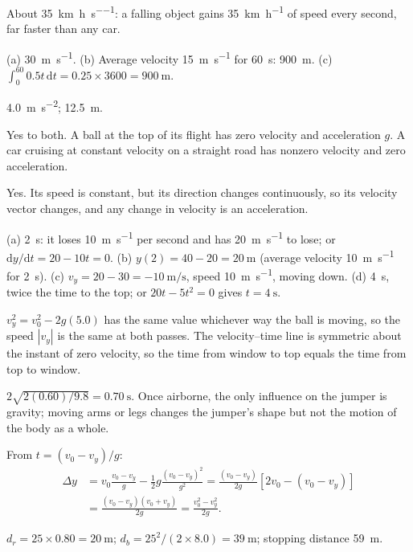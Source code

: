 \documentclass[11pt,twoside,openany]{book}
\newcommand{\dd}{\mathrm{d}}
\begin{document}
\begin{description}[leftmargin=2.6em,itemsep=3pt,style=sameline]
  \item[2.43] About \SI{35}{\kilo\metre\per\hour\per\second}: a falling object gains \SI{35}{\kilo\metre\per\hour} of speed every second, far faster than any car.
  \item[2.44] (a) \SI{30}{\metre\per\second}. (b) Average velocity \SI{15}{\metre\per\second} for \SI{60}{\second}: \SI{900}{\metre}. (c) $\int_0^{60} 0.5t\,\dd t = 0.25 \times 3600 = \SI{900}{\metre}$.
  \item[2.45] \SI{4.0}{\metre\per\second\squared}; \SI{12.5}{\metre}.
  \item[2.46] Yes to both. A ball at the top of its flight has zero velocity and acceleration $g$. A car cruising at constant velocity on a straight road has nonzero velocity and zero acceleration.
  \item[2.47] Yes. Its speed is constant, but its direction changes continuously, so its velocity vector changes, and any change in velocity is an acceleration.
  \item[2.48] (a) \SI{2}{\second}: it loses \SI{10}{\metre\per\second} per second and has \SI{20}{\metre\per\second} to lose; or $\dd y/\dd t = 20 - 10t = 0$. (b) $y(2) = 40 - 20 = \SI{20}{\metre}$ (average velocity \SI{10}{\metre\per\second} for \SI{2}{\second}). (c) $v_y = 20 - 30 = \SI{-10}{\metre\per\second}$, speed \SI{10}{\metre\per\second}, moving down. (d) \SI{4}{\second}, twice the time to the top; or $20t - 5t^2 = 0$ gives $t = \SI{4}{\second}$.
  \item[2.49] $v_y^2 = v_0^2 - 2g(5.0)$ has the same value whichever way the ball is moving, so the speed $|v_y|$ is the same at both passes. The velocity--time line is symmetric about the instant of zero velocity, so the time from window to top equals the time from top to window.
  \item[2.50] $2\sqrt{2(0.60)/9.8} = \SI{0.70}{\second}$. Once airborne, the only influence on the jumper is gravity; moving arms or legs changes the jumper's shape but not the motion of the body as a whole.
  \item[2.51] From $t = (v_0 - v_y)/g$:
  \begin{align*}
  \Delta y &= v_0\frac{v_0 - v_y}{g} - \tfrac12 g\frac{(v_0 - v_y)^2}{g^2} = \frac{(v_0 - v_y)}{2g}\left[2v_0 - (v_0 - v_y)\right] \\
  &= \frac{(v_0 - v_y)(v_0 + v_y)}{2g} = \frac{v_0^2 - v_y^2}{2g}.
  \end{align*}
  \item[2.52] $d_r = 25 \times 0.80 = \SI{20}{\metre}$; $d_b = 25^2/(2 \times 8.0) = \SI{39}{\metre}$; stopping distance \SI{59}{\metre}.

\end{description}
\end{document}
